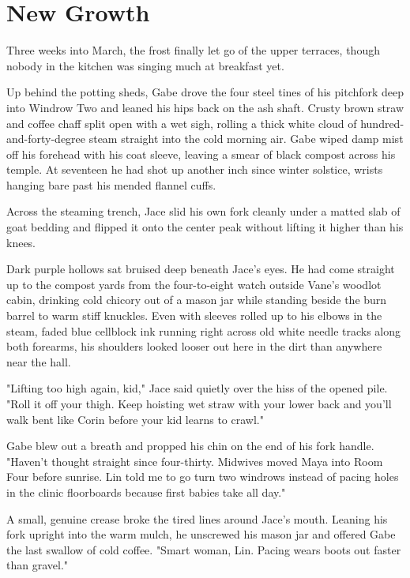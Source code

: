 \chapter{New Growth}

Three weeks into March, the frost finally let go of the upper terraces, though nobody in the kitchen was singing much at breakfast yet.

Up behind the potting sheds, Gabe drove the four steel tines of his pitchfork deep into Windrow Two and leaned his hips back on the ash shaft. Crusty brown straw and coffee chaff split open with a wet sigh, rolling a thick white cloud of hundred-and-forty-degree steam straight into the cold morning air. Gabe wiped damp mist off his forehead with his coat sleeve, leaving a smear of black compost across his temple. At seventeen he had shot up another inch since winter solstice, wrists hanging bare past his mended flannel cuffs.

Across the steaming trench, Jace slid his own fork cleanly under a matted slab of goat bedding and flipped it onto the center peak without lifting it higher than his knees.

Dark purple hollows sat bruised deep beneath Jace's eyes. He had come straight up to the compost yards from the four-to-eight watch outside Vane's woodlot cabin, drinking cold chicory out of a mason jar while standing beside the burn barrel to warm stiff knuckles. Even with sleeves rolled up to his elbows in the steam, faded blue cellblock ink running right across old white needle tracks along both forearms, his shoulders looked looser out here in the dirt than anywhere near the hall.

"Lifting too high again, kid," Jace said quietly over the hiss of the opened pile. "Roll it off your thigh. Keep hoisting wet straw with your lower back and you'll walk bent like Corin before your kid learns to crawl."

Gabe blew out a breath and propped his chin on the end of his fork handle. "Haven't thought straight since four-thirty. Midwives moved Maya into Room Four before sunrise. Lin told me to go turn two windrows instead of pacing holes in the clinic floorboards because first babies take all day."

A small, genuine crease broke the tired lines around Jace's mouth. Leaning his fork upright into the warm mulch, he unscrewed his mason jar and offered Gabe the last swallow of cold coffee. "Smart woman, Lin. Pacing wears boots out faster than gravel."

